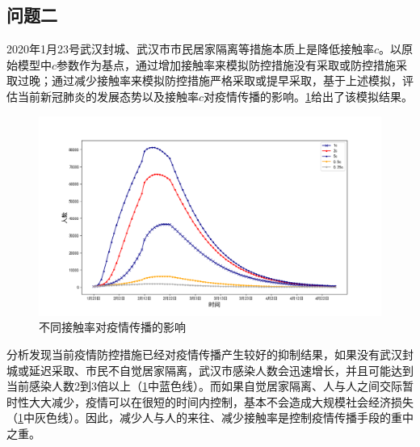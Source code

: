 \documentclass[withoutpre]{cumcmthesis} %
\begin{document}
\subsection{问题二}
2020年1月23号武汉封城、武汉市市民居家隔离等措施本质上是降低接触率$c$。以原始模型中$c$参数作为基点，通过增加接触率来模拟防控措施没有采取或防控措施采取过晚；通过减少接触率来模拟防控措施严格采取或提早采取，基于上述模拟，评估当前新冠肺炎的发展态势以及接触率$c$对疫情传播的影响。\cref{fig:c}给出了该模拟结果。
\begin{figure}[!h]
    \centering
    \includegraphics[width=1.0\textwidth]{figures/c.png}
    \caption{不同接触率对疫情传播的影响}
    \label{fig:c}
\end{figure}

分析发现当前疫情防控措施已经对疫情传播产生较好的抑制结果，如果没有武汉封城或延迟采取、市民不自觉居家隔离，武汉市感染人数会迅速增长，并且可能达到当前感染人数2到3倍以上（\cref{fig:c}中蓝色线）。而如果自觉居家隔离、人与人之间交际暂时性大大减少，疫情可以在很短的时间内控制，基本不会造成大规模社会经济损失（\cref{fig:c}中灰色线）。因此，减少人与人的来往、减少接触率是控制疫情传播手段的重中之重。
\end{document}

